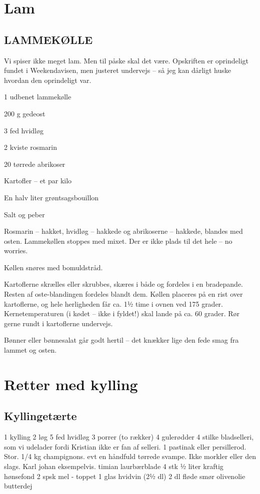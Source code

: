 \documentclass[
]{book}
\begin{document}
\chapter{Lam}\label{lam}

\section{LAMMEKØLLE}\label{lammekuxf8lle}

Vi spiser ikke meget lam. Men til påske skal det være. Opskriften er oprindeligt fundet i Weekendavisen, men justeret undervejs -- så jeg kan dårligt huske hvordan den oprindeligt var.

1 udbenet lammekølle

200 g gedeost

3 fed hvidløg

2 kviste rosmarin

20 tørrede abrikoser

Kartofler -- et par kilo

En halv liter grøntsagsbouillon

Salt og peber

Rosmarin -- hakket, hvidløg -- hakkede og abrikoserne -- hakkede, blandes med osten. Lammekøllen stoppes med mixet. Der er ikke plads til det hele -- no worries.

Køllen snøres med bomuldstråd.

Kartoflerne skrælles eller skrubbes, skæres i både og fordeles i en bradepande. Resten af oste-blandingen fordeles blandt dem. Køllen placeres på en rist over kartoflerne, og hele herligheden får ca. 1½ time i ovnen ved 175 grader. Kernetemperaturen (i kødet -- ikke i fyldet!) skal lande på ca. 60 grader. Rør gerne rundt i kartoflerne undervejs.

Bønner eller bønnesalat går godt hertil -- det knækker lige den fede smag fra lammet og osten.

\chapter{Retter med kylling}\label{retter-med-kylling}

\section{Kyllingetærte}\label{kyllingetuxe6rte}

1 kylling
2 løg
5 fed hvidløg
3 porrer (to rækker)
4 gulerødder
4 stilke bladselleri, som vi udelader fordi Kristian ikke er fan af selleri.
1 pastinak eller persillerod. Stor.
1/4 kg champignons.
evt en håndfuld tørrede svampe. Ikke morkler eller den slags. Karl johan eksempelvis.
timian
laurbærblade 4 stk
½ liter kraftig hønsefond
2 spsk mel - toppet
1 glas hvidvin (2½ dl)
2 dl fløde
smør
olivenolie
butterdej
\end{document}
